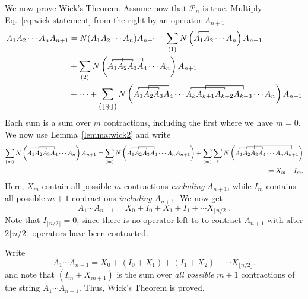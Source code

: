 \documentclass{report}
\theoremstyle{plain}
\theoremstyle{definition}
\begin{document}
We now prove Wick's Theorem. 
Assume now that $\mathcal{P}_n$ is true. Multiply
Eq.~\eqref{eq:wick-statement} from the right by an operator $A_{n+1}$:
\begin{equation}
\begin{split}
\label{eq:wick-statement-2}
A_1 A_2 \cdots A_n A_{n+1} &= N(A_1 A_2\cdots A_n)A_{n+1} + \sum_{\pr{1}} \kpr{ 
\contraction[0.5ex]{}{A_1}{}{A_2} A_1A_2\cdots A_n} A_{n+1}\\
&+ \sum_{\pr{2}}
\kpr{\contraction[0.5ex]{}{A_1}{A_2}{A_3}\contraction[1.0ex]{A_1}{A_2}{A_3}{A_4}A_1
  A_2 A_3 A_4 \cdots A_n} A_{n+1}\\
&+ \cdots +
\sum_{\pr{\lfloor{\frac{n}{2}}\rfloor}}\kpr{\contraction[0.5ex]{}{A_1}{A_2}{A_3}\contraction[1.0ex]{A_1}{A_2}{A_3}{A_4}
  A_1 A_2 A_3 A_4 \cdots
  \contraction[0.5ex]{}{A_k}{A_{k+1}}{A_{k+2}}\contraction[1.0ex]{A_k}{A_{k+1}}{A_{k+2}}{A_{k+3}}
  A_k A_{k+1} A_{k+2} A_{k+3} \cdots A_n} A_{n+1}
\end{split}
\end{equation}
Each sum is a sum over $m$ contractions, including the first where we
have $m=0$. We now use Lemma~\ref{lemma:wick2} and write
\begin{equation}
  \begin{split}
  \sum_{(m)}
  \kpr{\contraction[0.5ex]{}{A_1}{A_2}{A_3}\contraction[1.0ex]{A_1}{A_2}{A_3}{A_4}A_1
    A_2 A_3 A_4 \cdots A_n} A_{n+1} =   \sum_{(m)}
  \kpr{\contraction[0.5ex]{}{A_1}{A_2}{A_3}\contraction[1.0ex]{A_1}{A_2}{A_3}{A_4}A_1
    A_2 A_3 A_4 \cdots A_n A_{n+1}} +   \sum_{(m)}\sum_r
  \kpr{\contraction[0.5ex]{}{A_1}{A_2}{A_3}\contraction[1.0ex]{A_1}{A_2}{A_3}{A_4}A_1
    A_2 \contraction[1.5ex]{}{A_3}{A_4\cdots A_n}{A_{n+1}} A_3 A_4
    \cdots A_n A_{n+1}}  \\ \qquad := X_m + I_{m}.
\end{split}
\end{equation}
Here, $X_m$ contain all possible $m$ contractions \emph{excluding}
$A_{n+1}$, while $I_m$ contains all possible $m+1$ contractions
\emph{including} $A_{n+1}$.
We now get
\begin{equation}
  A_1\cdots A_{n+1} = X_0 + I_0 + X_1 + I_1 + \cdots X_{\lfloor{n/2}\rfloor} .
\end{equation}
Note that $I_{\lfloor{n/2}\rfloor}=0$, since there is no operator left
to to contract $A_{n+1}$ with after $2\lfloor{n/2}\rfloor$ operators
have been contracted.

Write
\begin{equation}
  A_1\cdots A_{n+1} = X_0 + (I_0 + X_1) + (I_1 + X_2) + \cdots X_{\lfloor{n/2}\rfloor} .
\end{equation}
and note that $(I_{m} + X_{m+1})$ is the sum over \emph{all possible}
$m+1$ contractions of the string $A_1\cdots A_{n+1}$. Thus, Wick's
Theorem is proved.
\end{document}
